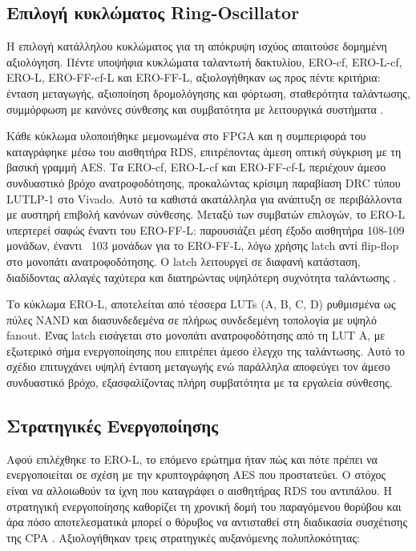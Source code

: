 \subsection*{Επιλογή κυκλώματος Ring-Oscillator} 
Η επιλογή κατάλληλου κυκλώματος για τη απόκρυψη ισχύος απαιτούσε δομημένη αξιολόγηση. Πέντε υποψήφια κυκλώματα ταλαντωτή δακτυλίου, ERO-cf, ERO-L-cf, ERO-L, ERO-FF-cf-L και ERO-FF-L, αξιολογήθηκαν ως προς πέντε κριτήρια: ένταση μεταγωγής, αξιοποίηση δρομολόγησης και φόρτωση, σταθερότητα ταλάντωσης, συμμόρφωση με κανόνες σύνθεσης και συμβατότητα με λειτουργικά συστήματα \cite{mahmoud2025roboost}.

Κάθε κύκλωμα υλοποιήθηκε μεμονωμένα στο FPGA και η συμπεριφορά του καταγράφηκε μέσω του αισθητήρα RDS, επιτρέποντας άμεση οπτική σύγκριση με τη βασική γραμμή AES. Τα ERO-cf, ERO-L-cf και ERO-FF-cf-L περιέχουν άμεσο συνδυαστικό βρόχο ανατροφοδότησης, προκαλώντας κρίσιμη παραβίαση DRC τύπου LUTLP-1 στο Vivado. Αυτό τα καθιστά ακατάλληλα για ανάπτυξη σε περιβάλλοντα με αυστηρή επιβολή κανόνων σύνθεσης. Μεταξύ των συμβατών επιλογών, το ERO-L υπερτερεί σαφώς έναντι του ERO-FF-L: παρουσιάζει μέση έξοδο αισθητήρα 108-109 μονάδων, έναντι ~103 μονάδων για το ERO-FF-L, λόγω χρήσης latch αντί flip-flop στο μονοπάτι ανατροφοδότησης. Ο latch λειτουργεί σε διαφανή κατάσταση, διαδίδοντας αλλαγές ταχύτερα και διατηρώντας υψηλότερη συχνότητα ταλάντωσης \cite{mahmoud2025roboost}. 

Το κύκλωμα ERO-L, αποτελείται από τέσσερα LUTs (A, B, C, D) ρυθμισμένα ως πύλες NAND και διασυνδεδεμένα σε πλήρως συνδεδεμένη τοπολογία με υψηλό fanout. Ένας latch εισάγεται στο μονοπάτι ανατροφοδότησης από τη LUT A, με εξωτερικό σήμα ενεργοποίησης που επιτρέπει άμεσο έλεγχο της ταλάντωσης. Αυτό το σχέδιο επιτυγχάνει υψηλή ένταση μεταγωγής ενώ παράλληλα αποφεύγει τον άμεσο συνδυαστικό βρόχο, εξασφαλίζοντας πλήρη συμβατότητα με τα εργαλεία σύνθεσης.

\subsection*{Στρατηγικές Ενεργοποίησης} 

Αφού επιλέχθηκε το ERO-L, το επόμενο ερώτημα ήταν πώς και πότε πρέπει να ενεργοποιείται σε σχέση με την κρυπτογράφηση AES που προστατεύει. Ο στόχος είναι να αλλοιωθούν τα ίχνη που καταγράφει ο αισθητήρας RDS του αντιπάλου. Η στρατηγική ενεργοποίησης καθορίζει τη χρονική δομή του παραγόμενου θορύβου και άρα πόσο αποτελεσματικά μπορεί ο θόρυβος να αντισταθεί στη διαδικασία συσχέτισης της CPA \cite{mangard2007power}. Αξιολογήθηκαν τρεις στρατηγικές αυξανόμενης πολυπλοκότητας:

